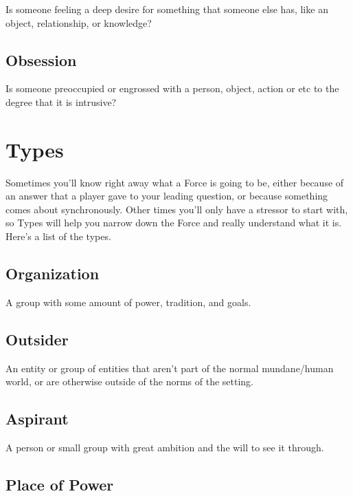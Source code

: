 \documentclass[
]{memoir}
\begin{document}
Is someone feeling a deep desire for something that someone else has,
like an object, relationship, or knowledge?

\hypertarget{obsession}{%
\subsection{Obsession}\label{obsession}}

Is someone preoccupied or engrossed with a person, object, action or etc
to the degree that it is intrusive?

\hypertarget{types}{%
\section{Types}\label{types}}

Sometimes you'll know right away what a Force is going to be, either
because of an answer that a player gave to your leading question, or
because something comes about synchronously. Other times you'll only
have a stressor to start with, so Types will help you narrow down the
Force and really understand what it is. Here's a list of the types.

\hypertarget{organization}{%
\subsection{Organization}\label{organization}}

A group with some amount of power, tradition, and goals.

\hypertarget{outsider}{%
\subsection{Outsider}\label{outsider}}

An entity or group of entities that aren't part of the normal
mundane/human world, or are otherwise outside of the norms of the
setting.

\hypertarget{aspirant}{%
\subsection{Aspirant}\label{aspirant}}

A person or small group with great ambition and the will to see it
through.

\hypertarget{place-of-power-4}{%
\subsection{Place of Power}\label{place-of-power-4}}
\end{document}
